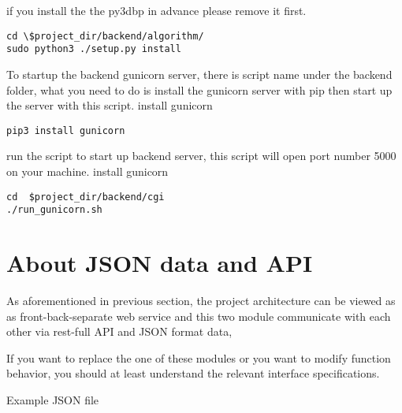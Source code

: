 \documentclass{article}
\begin{document}
if you install the the py3dbp in advance please remove it first.

\begin{mdframed}[backgroundcolor=bg]
\begin{verbatim}
cd \$project_dir/backend/algorithm/
sudo python3 ./setup.py install
\end{verbatim}
\end{mdframed}

To startup the backend gunicorn server, there is script name under the backend folder, what you need to do is install the gunicorn server with pip then start up the server with this script.\newline
\noindent install gunicorn
\begin{mdframed}[backgroundcolor=bg]
\begin{verbatim}
pip3 install gunicorn
\end{verbatim}
\end{mdframed}
\noindent run the script to start up backend server,
this script will open port number 5000 on your machine.
\noindent install gunicorn
\begin{mdframed}[backgroundcolor=bg]
\begin{verbatim}
cd  $project_dir/backend/cgi
./run_gunicorn.sh
\end{verbatim}
\end{mdframed}

\section{About JSON data and API}
As aforementioned in previous section, the project architecture can be viewed as as front-back-separate web service and this two module communicate with each other via rest-full API and JSON format data, 

If you want to replace the one of these modules or you want to modify function behavior, you should at least understand the relevant interface specifications.

\newpage
\caption{Example JSON file}
\end{document}
